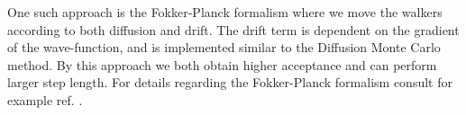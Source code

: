 One such approach is the Fokker-Planck formalism where we move the
walkers according to both diffusion and drift. The drift term is
dependent on the gradient of the wave-function, and is implemented
similar to the Diffusion Monte Carlo method. By this approach we
both obtain higher acceptance and can perform larger step length. For
details regarding the Fokker-Planck formalism consult for example
ref. \cite{hammond1994}. 



%
%

%  

%  

%  
%  
%  
%
